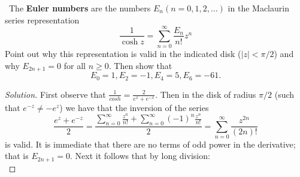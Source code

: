 \documentclass[11pt]{amsart}
\theoremstyle{definition}
\numberwithin{theorem}{section}
\numberwithin{definition}{section}
\numberwithin{equation}{section}
\newenvironment{solution}
  {\begin{proof}[Solution]}
  {\end{proof}}
\begin{document}
\medskip {}\ The \textbf{Euler numbers} are the numbers $E_n (n = 0, 1, 2, \dots)$ in the Maclaurin series representation
\begin{equation*}
 	\frac{1}{\cosh z} = \sum_{n=0}^\infty \frac{E_n}{n!} z^n
 \end{equation*} 
 Point out why this representation is valid in the indicated disk ($|z| < \pi/2$) and why $E_{2n+1} = 0$ for all $n \geq 0.$
 Then show that 
 \begin{equation*}
 	E_0 = 1, E_2 = -1, E_4 = 5, E_6=  -61.
 \end{equation*}
 \begin{solution}
 	First observe that $\frac{1}{cosh} = \frac{2}{e^x + e^{-x}}.$ Then in the disk of radius $\pi/2$ (such that $e^{-z} \neq -e^{z}$) we have that the inversion of the series 
 	\begin{equation*}
 		\frac{e^z + e^{-z}}{2} = \frac{\sum_{n=0}^\infty \frac{z^n}{n!} + \sum_{n=0}^\infty (-1)^n \frac{z^n}{n!}}{2} = \sum_{n=0}^\infty \frac{z^{2n}}{(2n)!}
 	\end{equation*}
 	is valid. It is immediate that there are no terms of odd power in the derivative; that is $E_{2n+1} = 0.$ Next it follows that by long division:
 	\\[5in]
 \end{solution}
\end{document}

